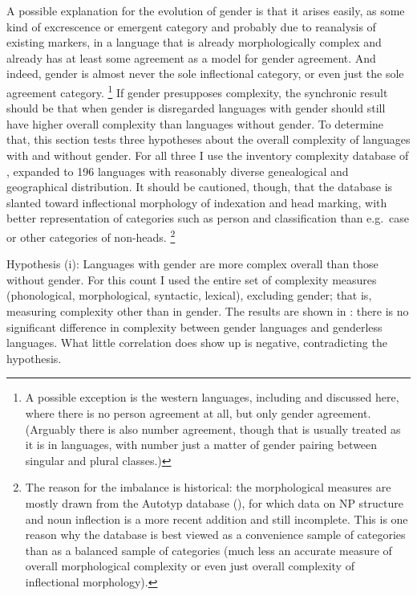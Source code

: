\documentclass[output=collectionpaper]{langsci/langscibook}
\begin{document}
A possible explanation for the evolution of gender is that it arises easily, as some kind of excrescence or emergent category and probably due to reanalysis of existing markers, in a language that is already morphologically complex and already has at least some agreement as a model for gender agreement. And indeed, gender is almost never the sole inflectional category, or even just the sole agreement category.%
\footnote{%
A possible exception is the western  languages, including  and  discussed here, where there is no person agreement at all, but only gender agreement. (Arguably there is also number agreement, though that is usually treated as it is in  languages, with number just a matter of gender pairing between singular and plural classes.)
} %
If gender presupposes complexity, the synchronic result should be that when gender is disregarded languages with gender should still have higher overall complexity than languages without gender. To determine that, this section tests three hypotheses about the overall complexity of languages with and without gender. For all three I use the inventory complexity database of \citet{Nichols2009}, expanded to 196 languages with reasonably diverse genealogical and geographical distribution. It should be cautioned, though, that the database is slanted toward inflectional morphology of indexation and head marking, with better representation of categories such as person and classification than e.g.\ case or other categories of non-heads.%
\footnote{%
\label{fn:Nich:9}
The reason for the imbalance is historical: the morphological measures are mostly drawn from the Autotyp database (\citealt{Bickel2017}), for which data on NP structure and noun inflection is a more recent addition and still incomplete. This is one reason why the database is best viewed as a convenience sample of categories than as a balanced sample of categories (much less an accurate measure of overall morphological complexity or even just overall complexity of inflectional morphology).
}%

Hypothesis (i): Languages with gender are more complex overall than those without gender. For this count I used the entire set of complexity measures (phonological, morphological, syntactic, lexical), excluding gender; that is, measuring complexity other than in gender. The results are shown in : there is no significant difference in complexity between gender languages and genderless languages. What little correlation does show up is negative, contradicting the hypothesis.
\end{document}
